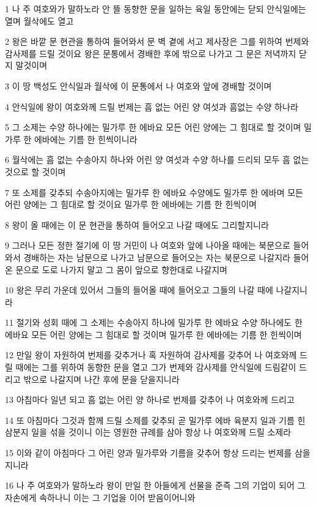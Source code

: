 \par 1 나 주 여호와가 말하노라 안 뜰 동향한 문을 일하는 육일 동안에는 닫되 안식일에는 열며 월삭에도 열고
\par 2 왕은 바깥 문 현관을 통하여 들어와서 문 벽 곁에 서고 제사장은 그를 위하여 번제와 감사제를 드릴 것이요 왕은 문통에서 경배한 후에 밖으로 나가고 그 문은 저녁까지 닫지 말것이며
\par 3 이 땅 백성도 안식일과 월삭에 이 문통에서 나 여호와 앞에 경배할 것이며
\par 4 안식일에 왕이 여호와께 드릴 번제는 흠 없는 어린 양 여섯과 흠없는 수양 하나라
\par 5 그 소제는 수양 하나에는 밀가루 한 에바요 모든 어린 양에는 그 힘대로 할 것이며 밀가루 한 에바에는 기름 한 힌씩이니라
\par 6 월삭에는 흠 없는 수송아지 하나와 어린 양 여섯과 수양 하나를 드리되 모두 흠 없는 것으로 할 것이며
\par 7 또 소제를 갖추되 수송아지에는 밀가루 한 에바요 수양에도 밀가루 한 에바며 모든 어린 양에는 그 힘대로 할 것이요 밀가루 한 에바에는 기름 한 힌씩이며
\par 8 왕이 올 때에는 이 문 현관을 통하여 들어오고 나갈 때에도 그리할지니라
\par 9 그러나 모든 정한 절기에 이 땅 거민이 나 여호와 앞에 나아올 때에는 북문으로 들어와서 경배하는 자는 남문으로 나가고 남문으로 들어오는 자는 북문으로 나갈지라 들어온 문으로 도로 나가지 말고 그 몸이 앞으로 향한대로 나갈지며
\par 10 왕은 무리 가운데 있어서 그들의 들어올 때에 들어오고 그들의 나갈 때에 나갈지니라
\par 11 절기와 성회 때에 그 소제는 수송아지 하나에 밀가루 한 에바요 수양 하나에도 한 에바요 모든 어린 양에는 그 힘대로 할 것이며 밀가루 한 에바에는 기름 한 힌씩이며
\par 12 만일 왕이 자원하여 번제를 갖추거나 혹 자원하여 감사제를 갖추어 나 여호와께 드릴 때에는 그를 위하여 동향한 문을 열고 그가 번제와 감사제를 안식일에 드림같이 드리고 밖으로 나갈지며 나간 후에 문을 닫을지니라
\par 13 아침마다 일년 되고 흠 없는 어린 양 하나로 번제를 갖추어 나 여호와께 드리고
\par 14 또 아침마다 그것과 함께 드릴 소제를 갖추되 곧 밀가루 에바 육분지 일과 기름 힌 삼분지 일을 섞을 것이니 이는 영원한 규례를 삼아 항상 나 여호와께 드릴 소제라
\par 15 이와 같이 아침마다 그 어린 양과 밀가루와 기름을 갖추어 항상 드리는 번제를 삼을 지니라
\par 16 나 주 여호와가 말하노라 왕이 만일 한 아들에게 선물을 준즉 그의 기업이 되어 그 자손에게 속하나니 이는 그 기업을 이어 받음이어니와
